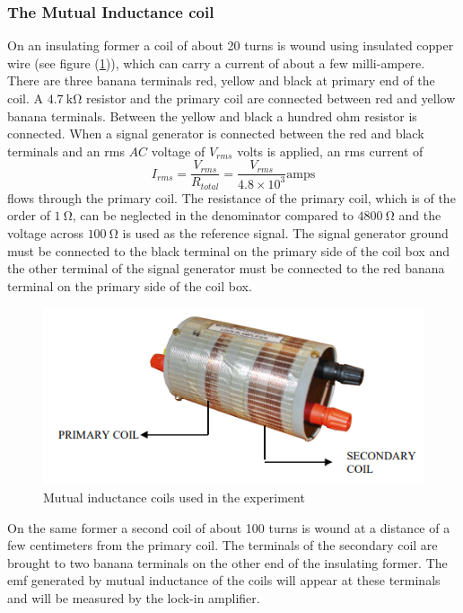\documentclass[%
 reprint,
nofootinbib,
 amsmath,amssymb,
 aps,
]{revtex4-2}
\begin{document}
        \subsubsection{The Mutual Inductance coil}
            On an insulating former a coil of about 20 turns is wound using insulated copper wire (see figure (\ref{fig:mutinductcoil})), which can carry a current of about a few milli-ampere. There are three banana terminals red, yellow and black at primary end of the coil. A $\SI{4.7}{\kilo \ohm}$ resistor and the primary coil are connected between red and yellow banana terminals. Between the yellow and black a hundred ohm resistor is connected. When a signal generator is connected between the red and black terminals and an rms $AC$ voltage of $V_{rms}$ volts is applied, an rms current of
            \begin{equation}
                I_{rms} = \dfrac{V_{rms}}{R_{total}} = \dfrac{V_{rms}}{4.8 \times 10^3} \text{amps}
            \end{equation}
            flows through the primary coil. The resistance of the primary coil, which is of the order of $\SI{1}{\ohm}$, can be neglected in the denominator compared to $\SI{4800}{\ohm}$ and the voltage across $\SI{100}{\ohm}$ is used as the reference signal. The signal generator ground must be connected to the black terminal on the primary side of the coil box and the other terminal of the signal generator must be connected to the red banana terminal on the primary side of the coil box.
            \begin{figure}
                \centering
                \includegraphics[scale = 0.7]{Figures/mutinductcoil.png}
                \caption{Mutual inductance coils used in the experiment}
                \label{fig:mutinductcoil}
            \end{figure}
            \par
            On the same former a second coil of about 100 turns is wound at a distance of a few centimeters from the primary coil. The terminals of the secondary coil are brought to two banana terminals on the other end of the insulating former. The emf generated by mutual inductance of the coils will appear at these terminals and will be measured by the lock-in amplifier. 
        
\end{document}
